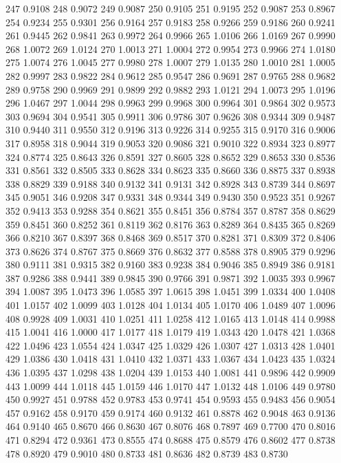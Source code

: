 247 0.9108
248 0.9072
249 0.9087
250 0.9105
251 0.9195
252 0.9087
253 0.8967
254 0.9234
255 0.9301
256 0.9164
257 0.9183
258 0.9266
259 0.9186
260 0.9241
261 0.9445
262 0.9841
263 0.9972
264 0.9966
265 1.0106
266 1.0169
267 0.9990
268 1.0072
269 1.0124
270 1.0013
271 1.0004
272 0.9954
273 0.9966
274 1.0180
275 1.0074
276 1.0045
277 0.9980
278 1.0007
279 1.0135
280 1.0010
281 1.0005
282 0.9997
283 0.9822
284 0.9612
285 0.9547
286 0.9691
287 0.9765
288 0.9682
289 0.9758
290 0.9969
291 0.9899
292 0.9882
293 1.0121
294 1.0073
295 1.0196
296 1.0467
297 1.0044
298 0.9963
299 0.9968
300 0.9964
301 0.9864
302 0.9573
303 0.9694
304 0.9541
305 0.9911
306 0.9786
307 0.9626
308 0.9344
309 0.9487
310 0.9440
311 0.9550
312 0.9196
313 0.9226
314 0.9255
315 0.9170
316 0.9006
317 0.8958
318 0.9044
319 0.9053
320 0.9086
321 0.9010
322 0.8934
323 0.8977
324 0.8774
325 0.8643
326 0.8591
327 0.8605
328 0.8652
329 0.8653
330 0.8536
331 0.8561
332 0.8505
333 0.8628
334 0.8623
335 0.8660
336 0.8875
337 0.8938
338 0.8829
339 0.9188
340 0.9132
341 0.9131
342 0.8928
343 0.8739
344 0.8697
345 0.9051
346 0.9208
347 0.9331
348 0.9344
349 0.9430
350 0.9523
351 0.9267
352 0.9413
353 0.9288
354 0.8621
355 0.8451
356 0.8784
357 0.8787
358 0.8629
359 0.8451
360 0.8252
361 0.8119
362 0.8176
363 0.8289
364 0.8435
365 0.8269
366 0.8210
367 0.8397
368 0.8468
369 0.8517
370 0.8281
371 0.8309
372 0.8406
373 0.8626
374 0.8767
375 0.8669
376 0.8632
377 0.8588
378 0.8905
379 0.9296
380 0.9111
381 0.9315
382 0.9160
383 0.9238
384 0.9046
385 0.8949
386 0.9181
387 0.9286
388 0.9441
389 0.9845
390 0.9766
391 0.9871
392 1.0035
393 0.9967
394 1.0087
395 1.0473
396 1.0585
397 1.0615
398 1.0451
399 1.0334
400 1.0408
401 1.0157
402 1.0099
403 1.0128
404 1.0134
405 1.0170
406 1.0489
407 1.0096
408 0.9928
409 1.0031
410 1.0251
411 1.0258
412 1.0165
413 1.0148
414 0.9988
415 1.0041
416 1.0000
417 1.0177
418 1.0179
419 1.0343
420 1.0478
421 1.0368
422 1.0496
423 1.0554
424 1.0347
425 1.0329
426 1.0307
427 1.0313
428 1.0401
429 1.0386
430 1.0418
431 1.0410
432 1.0371
433 1.0367
434 1.0423
435 1.0324
436 1.0395
437 1.0298
438 1.0204
439 1.0153
440 1.0081
441 0.9896
442 0.9909
443 1.0099
444 1.0118
445 1.0159
446 1.0170
447 1.0132
448 1.0106
449 0.9780
450 0.9927
451 0.9788
452 0.9783
453 0.9741
454 0.9593
455 0.9483
456 0.9054
457 0.9162
458 0.9170
459 0.9174
460 0.9132
461 0.8878
462 0.9048
463 0.9136
464 0.9140
465 0.8670
466 0.8630
467 0.8076
468 0.7897
469 0.7700
470 0.8016
471 0.8294
472 0.9361
473 0.8555
474 0.8688
475 0.8579
476 0.8602
477 0.8738
478 0.8920
479 0.9010
480 0.8733
481 0.8636
482 0.8739
483 0.8730
